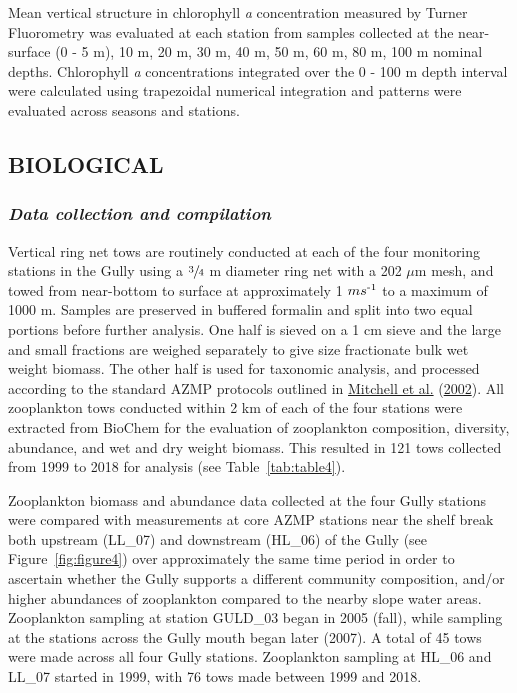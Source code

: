 \documentclass[12pt]{article}\usepackage[]{graphicx}\usepackage[]{color}
\begin{document}
Mean vertical structure in chlorophyll \emph{a} concentration measured by Turner Fluorometry was evaluated at each station from samples collected at the near-surface (0 - 5 m), 10 m, 20 m, 30 m, 40 m, 50 m, 60 m, 80 m, 100 m nominal depths. Chlorophyll \emph{a} concentrations integrated over the 0 - 100 m depth interval were calculated using trapezoidal numerical integration and patterns were evaluated across seasons and stations.

\hypertarget{sec:biological-data}{%
\subsection{\texorpdfstring{\textbf{BIOLOGICAL}}{BIOLOGICAL}}\label{sec:biological-data}}

\hypertarget{data-collection-and-compilation-2}{%
\subsubsection{\texorpdfstring{\emph{Data collection and compilation}}{Data collection and compilation}}\label{data-collection-and-compilation-2}}

Vertical ring net tows are routinely conducted at each of the four monitoring stations in the Gully using a \(\sfrac{3}{4}\) m diameter ring net with a 202 \(\mu\)m mesh, and towed from near-bottom to surface at approximately 1 \(m s\textsuperscript{-1}\) to a maximum of 1000 m. Samples are preserved in buffered formalin and split into two equal portions before further analysis. One half is sieved on a 1 cm sieve and the large and small fractions are weighed separately to give size fractionate bulk wet weight biomass. The other half is used for taxonomic analysis, and processed according to the standard AZMP protocols outlined in \protect\hyperlink{ref-mitchell_2002}{Mitchell et al.} (\protect\hyperlink{ref-mitchell_2002}{2002}). All zooplankton tows conducted within 2 km of each of the four stations were extracted from BioChem for the evaluation of zooplankton composition, diversity, abundance, and wet and dry weight biomass. This resulted in 121 tows collected from 1999 to 2018 for analysis (see Table~\ref{tab:table4}).

Zooplankton biomass and abundance data collected at the four Gully stations were compared with measurements at core AZMP stations near the shelf break both upstream (LL\_07) and downstream (HL\_06) of the Gully (see Figure~\ref{fig:figure4}) over approximately the same time period in order to ascertain whether the Gully supports a different community composition, and/or higher abundances of zooplankton compared to the nearby slope water areas. Zooplankton sampling at station GULD\_03 began in 2005 (fall), while sampling at the stations across the Gully mouth began later (2007). A total of 45 tows were made across all four Gully stations. Zooplankton sampling at HL\_06 and LL\_07 started in 1999, with 76 tows made between 1999 and 2018.
\end{document}
